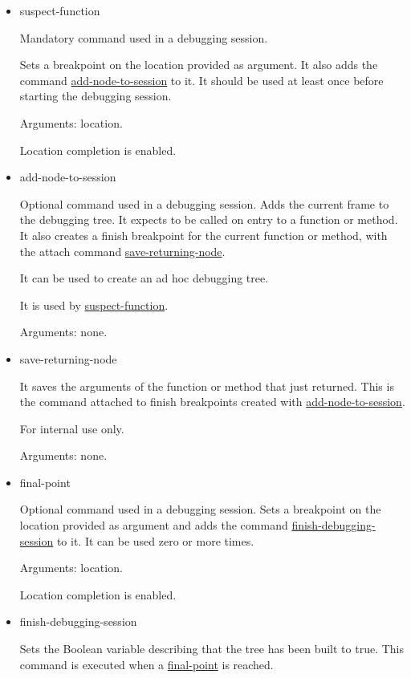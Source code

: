 \begin{itemize}
    \item suspect-function
\label{command:suspect-function}

Mandatory command used in a debugging session.

Sets a breakpoint on the location provided as argument. It also adds the command \hyperref[command:add-node-to-session]{add-node-to-session} to it.
It should be used at least once before starting the debugging session.

Arguments: location.

Location completion is enabled.


\item add-node-to-session
\label{command:add-node-to-session}

Optional command used in a debugging session.
Adds the current frame to the debugging tree.
It expects to be called on entry to a function or method.
It also creates a finish breakpoint for the current function or method, with the attach command \hyperref[command:save-returning-node]{save-returning-node}.

It can be used to create an ad hoc debugging tree.

It is used by \hyperref[command:suspect-function]{suspect-function}.

Arguments: none.
\item save-returning-node
\label{command:save-returning-node}

It saves the arguments of the function or method that just returned.
This is the command attached to finish breakpoints created with \hyperref[command:add-node-to-session]{add-node-to-session}.

For internal use only.

Arguments: none.
\item final-point
\label{command:final-point}

Optional command used in a debugging session.
Sets a breakpoint on the location provided as argument and adds the command \hyperref[command:finish-debugging-session]{finish-debugging-session} to it.
It can be used zero or more times.

Arguments: location.

Location completion is enabled.
\item finish-debugging-session
\label{command:finish-debugging-session}

Sets the Boolean variable describing that the tree has been built to true.
This command is executed when a \hyperref[command:final-point]{final-point} is reached.


\end{itemize}

